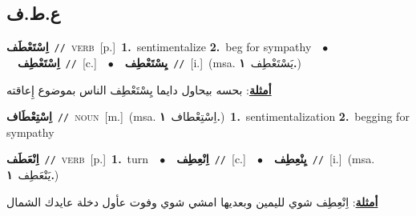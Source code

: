 \documentclass[10pt,a4paper,twoside]{article} %
\begin{document}
\begin{multicols}{2}
\vspace{-3mm}
\subsection*{\color{blue}\foreignlanguage{arabic}{ع.ط.ف}\color{blue}{}} 

{\setlength\topsep{0pt}\textbf{\foreignlanguage{arabic}{اِسْتَعْطَف}}\ {\color{gray}\texttt{//}\color{black}}\ \textsc{verb}\ [p.]\ \textbf{1.}~sentimentalize  \textbf{2.}~beg for sympathy\ \ $\bullet$\ \ \setlength\topsep{0pt}\textbf{\foreignlanguage{arabic}{اِسْتَعْطِف}}\ {\color{gray}\texttt{//}\color{black}}\ [c.]\ \ $\bullet$\ \ \setlength\topsep{0pt}\textbf{\foreignlanguage{arabic}{يِسْتَعْطِف}}\ {\color{gray}\texttt{//}\color{black}}\ [i.]\ \color{gray}(msa. \foreignlanguage{arabic}{يَسْتَعْطِف}~\foreignlanguage{arabic}{\textbf{١.}})\color{black}\  \begin{flushright}\color{gray}\foreignlanguage{arabic}{\textbf{\underline{\foreignlanguage{arabic}{أمثلة}}}: بحسه بيحاول دايما يِسْتَعْطِف الناس بموضوع إِعاقته}\end{flushright}\color{black}} \vspace{2mm}

{\setlength\topsep{0pt}\textbf{\foreignlanguage{arabic}{اِسْتِعْطَاف}}\ {\color{gray}\texttt{//}\color{black}}\ \textsc{noun}\ [m.]\ \color{gray}(msa. \foreignlanguage{arabic}{اِسْتِعْطاف}~\foreignlanguage{arabic}{\textbf{١.}})\color{black}\ \textbf{1.}~sentimentalization  \textbf{2.}~begging for sympathy\ } \vspace{2mm}

{\setlength\topsep{0pt}\textbf{\foreignlanguage{arabic}{اِنْعَطَف}}\ {\color{gray}\texttt{//}\color{black}}\ \textsc{verb}\ [p.]\ \textbf{1.}~turn\ \ $\bullet$\ \ \setlength\topsep{0pt}\textbf{\foreignlanguage{arabic}{اِنْعِطِف}}\ {\color{gray}\texttt{//}\color{black}}\ [c.]\ \ $\bullet$\ \ \setlength\topsep{0pt}\textbf{\foreignlanguage{arabic}{يِنْعِطِف}}\ {\color{gray}\texttt{//}\color{black}}\ [i.]\ \color{gray}(msa. \foreignlanguage{arabic}{يَنْعَطِف}~\foreignlanguage{arabic}{\textbf{١.}})\color{black}\  \begin{flushright}\color{gray}\foreignlanguage{arabic}{\textbf{\underline{\foreignlanguage{arabic}{أمثلة}}}: اِنْعِطِف شوي لليمين وبعديها امشي شوي وفوت عأول دخلة عايدك الشمال}\end{flushright}\color{black}} \vspace{2mm}


\end{multicols}
\end{document}
